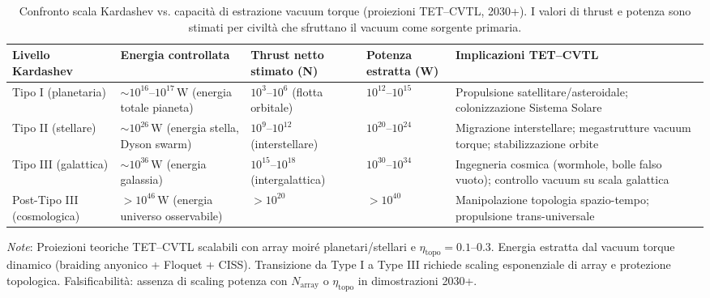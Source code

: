 \documentclass[11pt,a4paper]{article}
\theoremstyle{plain}
\theoremstyle{definition}
\begin{document}
\begin{table}[H]
\centering
\caption{Confronto scala Kardashev vs. capacità di estrazione vacuum torque (proiezioni TET--CVTL, 2030+). I valori di thrust e potenza sono stimati per civiltà che sfruttano il vacuum come sorgente primaria.}
\small
\arrayrulewidth=0.8pt

\begin{adjustbox}{max width=\textwidth}
\begin{tabularx}{\textwidth}{
  | >{\raggedright\arraybackslash}p{4.5cm}   %
  | >{\centering\arraybackslash}X             %
  | >{\centering\arraybackslash}X             %
  | >{\centering\arraybackslash}X             %
  | >{\raggedright\arraybackslash}p{5.5cm} | %
}
\hline
\rowcolor{blue!15}
\textbf{Livello Kardashev} & \textbf{Energia controllata} & \textbf{Thrust netto stimato (N)} & \textbf{Potenza estratta (W)} & \textbf{Implicazioni TET--CVTL} \\
\hline
Tipo I (planetaria) & $\sim 10^{16}$--$10^{17}\,\mathrm{W}$ (energia totale pianeta) & $10^3$--$10^6$ (flotta orbitale) & $10^{12}$--$10^{15}$ & Propulsione satellitare/asteroidale; colonizzazione Sistema Solare \\
\hline
Tipo II (stellare) & $\sim 10^{26}\,\mathrm{W}$ (energia stella, Dyson swarm) & $10^9$--$10^{12}$ (interstellare) & $10^{20}$--$10^{24}$ & Migrazione interstellare; megastrutture vacuum torque; stabilizzazione orbite \\
\hline
Tipo III (galattica) & $\sim 10^{36}\,\mathrm{W}$ (energia galassia) & $10^{15}$--$10^{18}$ (intergalattica) & $10^{30}$--$10^{34}$ & Ingegneria cosmica (wormhole, bolle falso vuoto); controllo vacuum su scala galattica \\
\hline
Post-Tipo III (cosmologica) & $>10^{46}\,\mathrm{W}$ (energia universo osservabile) & $>10^{20}$ & $>10^{40}$ & Manipolazione topologia spazio-tempo; propulsione trans-universale \\
\hline
\end{tabularx}
\end{adjustbox}
\vspace{0.8em}

\vspace{0.2cm}

{\footnotesize 
\textit{Note}: Proiezioni teoriche TET--CVTL scalabili con array moiré planetari/stellari e $\eta_{\mathrm{topo}} = 0.1$--$0.3$. Energia estratta dal vacuum torque dinamico (braiding anyonico + Floquet + CISS). Transizione da Type I a Type III richiede scaling esponenziale di array e protezione topologica. Falsificabilità: assenza di scaling potenza con $N_{\mathrm{array}}$ o $\eta_{\mathrm{topo}}$ in dimostrazioni 2030+.
}
\label{tab:kardashev-vacuum-torque}
\end{table}
\end{document}
